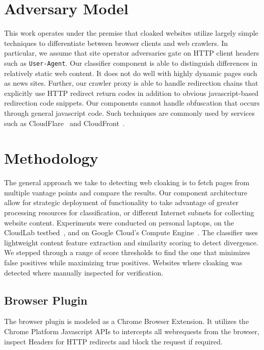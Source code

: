 \documentclass[letterpaper,twocolumn,10pt]{article}
\begin{document}
\section{Adversary Model}

This work operates under the premise that cloaked websites utilize largely simple techniques to differentiate between browser clients and web crawlers. In particular, we assume that site operator adversaries gate on HTTP client headers such as \texttt{User-Agent}.
Our classifier component is able to distinguish differences in relatively static web content.  It does not do well with highly dynamic pages such as news sites.  Further, our crawler proxy is able to handle redirection chains that explicitly use HTTP redirect return codes in addition to obvious javascript-based redirection code snippets.  Our components cannot handle obfuscation that occurs through general javascript code.  Such techniques are commonly used by services such as CloudFlare~\cite{cloudflare} and CloudFront~\cite{cloudfront}.

\section{Methodology}

The general approach we take to detecting web cloaking is to fetch pages from multiple vantage points and compare the results.  Our component architecture allow for strategic deployment of functionality to take advantage of greater processing resources for classification, or different Internet subnets for collecting website content. Experiments were conducted on personal laptops, on the CloudLab testbed~\cite{cloudlab}, and on Google Cloud's Compute Engine~\cite{gcloud}. The classifier uses lightweight content feature extraction and similarity scoring to detect divergence.  We stepped through a range of score thresholds to find the one that minimizes false positives while maximizing true positives.  Websites where cloaking was detected where manually inspected for verification.

\subsection{Browser Plugin}

The browser plugin is modeled as a Chrome Browser Extension. It utilizes the Chrome Platform Javascript APIs to intercepts all webrequests from the browser, inspect Headers for HTTP redirects and block the request if required.
\end{document}
